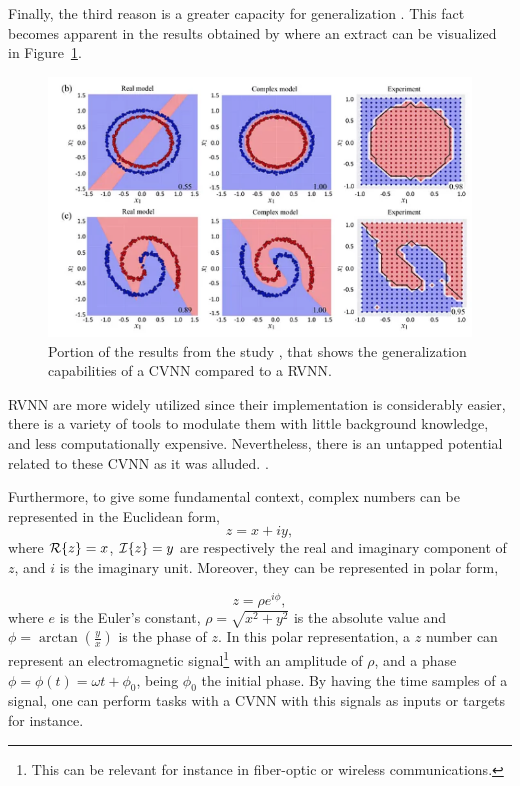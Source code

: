Finally, the third reason is a greater capacity for generalization \parencite{lee2022survey}. This fact becomes apparent in the results obtained by \parencite{zhang2021optical} where an extract can be visualized in Figure~\ref{fig:extract}.

\begin{figure}[htbp]
	\centering
	\includegraphics[width=1.\textwidth]{ch1/assets/extract.png}
	\caption{Portion of the results from the study \parencite{zhang2021optical}, that shows the generalization capabilities of a CVNN compared to a RVNN.}
	\label{fig:extract}
\end{figure}

\gls{RVNN} are more widely utilized since their implementation is considerably easier, there is a variety of tools to modulate them with little background knowledge, and less computationally expensive. Nevertheless, there is an untapped potential related to these \gls{CVNN} as it was alluded. \parencite{lee2022survey}. 

Furthermore, to give some fundamental context, complex numbers can be represented in the Euclidean form,
\begin{equation}
	z = x + iy,
\end{equation}
where $ \mathcal{R}\{ z \} = x $, $ \mathcal{I}\{ z \} = y $ are respectively the real and imaginary component of $ z $, and $ i $ is the imaginary unit. Moreover, they can be represented in polar form,

\begin{equation}
	z = \rho e^{i \phi},
\end{equation}
where $ e $ is the Euler's constant, $ \rho = \sqrt{x^2 + y^2} $ is the absolute value and $ \phi = \arctan\left( \frac{y}{x} \right) $ is the phase of $ z $.  In this polar representation, a $ z $ number can represent an electromagnetic signal\footnote{This can be relevant for instance in fiber-optic or wireless communications.} with an amplitude of $ \rho $, and a phase $ \phi = \phi(t) = \omega t + \phi_0 $, being $ \phi_0 $ the initial phase. By having the time samples of a signal, one can perform tasks with a \gls{CVNN} with this signals as inputs or targets for instance. 

